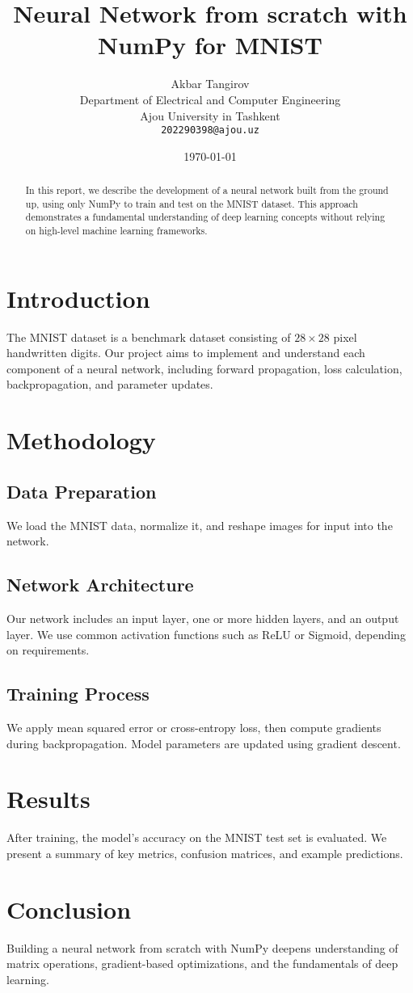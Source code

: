 \documentclass{article}
\title{Neural Network from scratch with NumPy for MNIST}
\author{
    Akbar Tangirov\\
    Department of Electrical and Computer Engineering\\
    Ajou University in Tashkent\\
    \texttt{202290398@ajou.uz}
}
\date{\today}
\begin{document}
\maketitle

\begin{abstract}
In this report, we describe the development of a neural network built from the ground up, using only NumPy to train and test on the MNIST dataset. This approach demonstrates a fundamental understanding of deep learning concepts without relying on high-level machine learning frameworks.
\end{abstract}

\section{Introduction}
The MNIST dataset is a benchmark dataset consisting of $28 \times 28$ pixel handwritten digits. Our project aims to implement and understand each component of a neural network, including forward propagation, loss calculation, backpropagation, and parameter updates. 

\section{Methodology}
\subsection{Data Preparation}
We load the MNIST data, normalize it, and reshape images for input into the network. 

\subsection{Network Architecture}
Our network includes an input layer, one or more hidden layers, and an output layer. We use common activation functions such as ReLU or Sigmoid, depending on requirements.

\subsection{Training Process}
We apply mean squared error or cross-entropy loss, then compute gradients during backpropagation. Model parameters are updated using gradient descent.

\section{Results}
After training, the model’s accuracy on the MNIST test set is evaluated. We present a summary of key metrics, confusion matrices, and example predictions.

\section{Conclusion}
Building a neural network from scratch with NumPy deepens understanding of matrix operations, gradient-based optimizations, and the fundamentals of deep learning.
\end{document}
